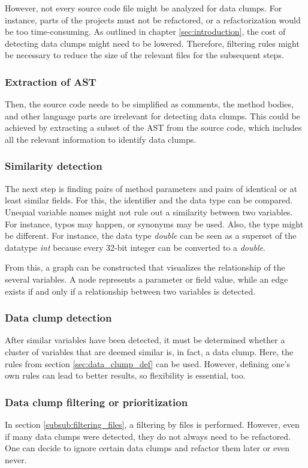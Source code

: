 However, not every source code file might be analyzed for data clumps. For instance, parts of the projects must not be refactored, or a refactorization would be too time-consuming. As outlined in chapter \ref{sec:introduction}, the cost of detecting data clumps might need to be lowered. Therefore, filtering rules might be necessary to reduce the size of the relevant files for the subsequent steps.  

\subsubsection{Extraction of AST}
Then,  the source code needs to be simplified as comments, the method bodies, and other language parts are irrelevant for detecting data clumps. This could be achieved by extracting a subset of the \ac{AST} from the source code, which includes all the relevant information to identify data clumps.
\subsubsection{Similarity detection}

The next step is finding pairs of method parameters and pairs of identical or at least similar fields. For this, the identifier and the data type can be compared. Unequal variable names might not rule out a similarity between two variables. For instance, typos may happen, or synonyms may be used. Also, the type might be different. For instance, the data type \textit{double} can be seen as a superset of the datatype \textit{int} because every 32-bit integer can be converted to a \textit{double}.

From this, a graph can be constructed that visualizes the relationship of the several variables. A node represents a parameter or field value, while an edge exists if and only if a relationship between two variables is detected. 

\subsubsection{Data clump detection}
After similar variables have been detected, it must be determined whether a cluster of variables that are deemed similar is, in fact, a data clump. Here, the rules from section \ref{sec:data_clump_def} can be used. However, defining one's own rules can lead to better results, so flexibility is essential, too. 

\subsubsection{Data clump filtering or prioritization} \label{subsub:filtering_data_clumps}
In section \ref{subsub:filtering_files}, a filtering by files is performed. However, even if many data clumps were detected, they do not always need to be refactored. One can decide to ignore certain data clumps and refactor them later or even never. 

